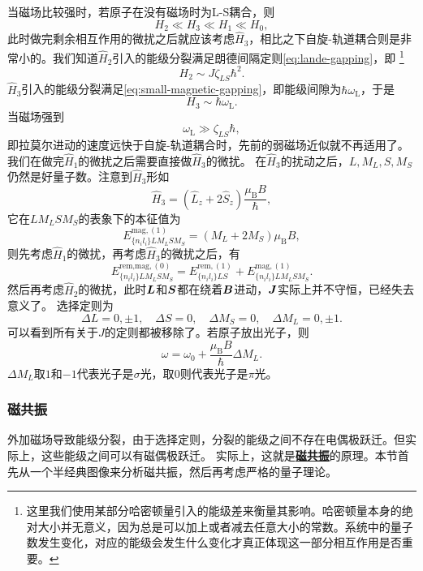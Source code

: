 \documentclass[UTF8, a4paper]{ctexart}
\newcommand*{\concept}[1]{\underline{\textbf{#1}}}
\begin{document}
当磁场比较强时，若原子在没有磁场时为L-S耦合，则
\begin{equation}
    {H}_2 \ll {H}_3 \ll {H}_1 \ll {H}_0,
\end{equation}
此时做完剩余相互作用的微扰之后就应该考虑$\hat{H}_3$，相比之下自旋-轨道耦合则是非常小的。我们知道$\hat{H}_2$引入的能级分裂满足朗德间隔定则\eqref{eq:lande-gapping}，即%
\footnote{这里我们使用某部分哈密顿量引入的能级差来衡量其影响。哈密顿量本身的绝对大小并无意义，因为总是可以加上或者减去任意大小的常数。系统中的量子数发生变化，对应的能级会发生什么变化才真正体现这一部分相互作用是否重要。}%
\[
    H_2 \sim J \zeta_{LS} \hbar^2.
\]
$\hat{H}_3$引入的能级分裂满足\eqref{eq:small-magnetic-gapping}，即能级间隙为$\hbar \omega_\text{L}$，于是
\[
    H_3 \sim \hbar \omega_\text{L}.
\]
当磁场强到
\begin{equation}
    \omega_\text{L} \gg \zeta_{LS} \hbar,
\end{equation}
即拉莫尔进动的速度远快于自旋-轨道耦合时，先前的弱磁场近似就不再适用了。
我们在做完$\hat{H}_1$的微扰之后需要直接做$\hat{H}_3$的微扰。
在$\hat{H}_3$的扰动之后，$L, M_L, S, M_S$仍然是好量子数。注意到$\hat{H}_3$形如
\[
    \hat{H}_3 = (\hat{L}_z + 2 \hat{S}_z) \frac{\mu_\text{B} B}{\hbar}, 
\]
它在$L M_L S M_S$的表象下的本征值为
\begin{equation}
    E^{\text{mag}, (1)}_{\{n_i l_i\} L M_L S M_S} = (M_L + 2 M_S) \mu_\text{B} B,
\end{equation}
则先考虑$\hat{H}_1$的微扰，再考虑$\hat{H}_3$的微扰之后，有
\[
    E^{\text{rem,mag}, (0)}_{\{n_i l_i\} L M_L S M_S} = E^{\text{rem}, (1)}_{\{n_i l_i\} LS} + E^{\text{mag}, (1)}_{\{n_i l_i\} L M_L S M_S}.
\]
然后再考虑$\hat{H}_2$的微扰，此时$\vb*{L}$和$\vb*{S}$都在绕着$\vb*{B}$进动，$\vb*{J}$实际上并不守恒，已经失去意义了。
选择定则为
\begin{equation}
    \Delta L = 0, \pm 1, \quad \Delta S = 0, \quad \Delta M_S = 0, \quad \Delta M_L = 0, \pm 1.
\end{equation}
可以看到所有关于$J$的定则都被移除了。若原子放出光子，则
\begin{equation}
    \omega = \omega_0 + \frac{\mu_\text{B} B}{\hbar} \Delta M_L.
\end{equation}
$\Delta M_L$取$1$和$-1$代表光子是$\sigma$光，取$0$则代表光子是$\pi$光。

\subsubsection{磁共振}

外加磁场导致能级分裂，由于选择定则，分裂的能级之间不存在电偶极跃迁。但实际上，这些能级之间可以有磁偶极跃迁。
实际上，这就是\concept{磁共振}的原理。本节首先从一个半经典图像来分析磁共振，然后再考虑严格的量子理论。
\end{document}
